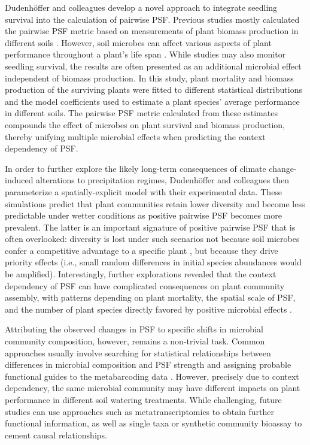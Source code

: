 \documentclass[hidelinks,letterpaper, 11pt]{article}
\begin{document}
Dudenh{\"o}ffer and colleagues develop a novel approach to integrate seedling survival into the calculation of pairwise PSF.
Previous studies mostly calculated the pairwise PSF metric based on measurements of plant biomass production in different soils \citep{Crawford2019}.
However, soil microbes can affect various aspects of plant performance throughout a plant's life span \citep{Dudenhoffer2017}.
While studies may also monitor seedling survival, the results are often presented as an additional microbial effect independent of biomass production.
In this study, plant mortality and biomass production of the surviving plants were fitted to different statistical distributions and the model coefficients used to estimate a plant species' average performance in different soils. 
The pairwise PSF metric calculated from these estimates compounds the effect of microbes on plant survival and biomass production, thereby unifying multiple microbial effects when predicting the context dependency of PSF. 
\medskip


In order to further explore the likely long-term consequences of climate change-induced alterations to precipitation regimes, Dudenh{\"o}ffer and colleagues then parameterize a spatially-explicit model with their experimental data. 
These simulations predict that plant communities retain lower diversity and become less predictable under wetter conditions as positive pairwise PSF becomes more prevalent.
The latter is an important signature of positive pairwise PSF that is often overlooked: diversity is lost under such scenarios not because soil microbes confer a competitive advantage to a specific plant \citep{Kandlikar2019}, but because they drive priority effects (i.e., small random differences in initial species abundances would be amplified).
Interestingly, further explorations revealed that the context dependency of PSF can have complicated consequences on plant community assembly, with patterns depending on plant mortality, the spatial scale of PSF, and the number of plant species directly favored by positive microbial effects \citep{Kandlikar2019}. 
\medskip


Attributing the observed changes in PSF to specific shifts in microbial community composition, however, remains a non-trivial task. 
Common approaches usually involve searching for statistical relationships between differences in microbial composition and PSF strength and assigning probable functional guides to the metabarcoding data \citep{Nguyen2016}.
However, precisely due to context dependency, the same microbial community may have different impacts on plant performance in different soil watering treatments.
While challenging, future studies can use approaches such as metatranscriptomics to obtain further functional information, as well as single taxa or synthetic community bioassay to cement causal relationships.
\medskip
\end{document}
